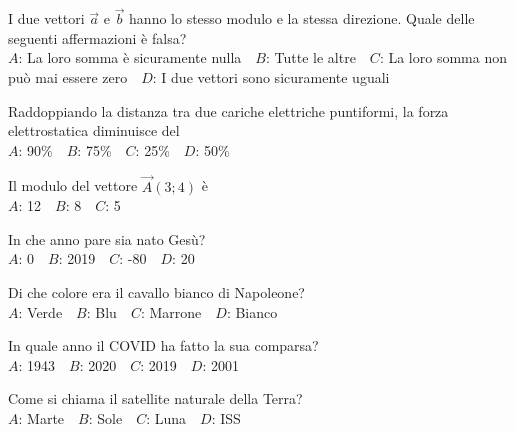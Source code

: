 \mcquestionheader I due vettori $\vec{a}$ e $\vec{b}$ hanno lo stesso modulo e la stessa direzione. Quale delle seguenti affermazioni è falsa?\\
{$A$}: La loro somma è sicuramente nulla\ \ {$B$}: Tutte le altre\ \ {$C$}: La loro somma non può mai essere zero\ \ {$D$}: I due vettori sono sicuramente uguali\ \ 

\mcquestionfooter



\def\mcquestionnumber{5}


\mcquestionheader Raddoppiando la distanza tra due cariche elettriche puntiformi, la forza elettrostatica diminuisce del\\
{$A$}: 90\%\ \ {$B$}: 75\%\ \ {$C$}: 25\%\ \ {$D$}: 50\%\ \ 

\mcquestionfooter



\def\mcquestionnumber{6}


\mcquestionheader Il modulo del vettore $\vec{A}(3;4)$ è\\
{$A$}: 12\ \ {$B$}: 8\ \ {$C$}: 5\ \ 

\mcquestionfooter



\def\mcquestionnumber{7}


\mcquestionheader In che anno pare sia nato Gesù?\\
{$A$}: 0\ \ {$B$}: 2019\ \ {$C$}: -80\ \ {$D$}: 20\ \ 

\mcquestionfooter



\def\mcquestionnumber{8}


\mcquestionheader Di che colore era il cavallo bianco di Napoleone?\\
{$A$}: Verde\ \ {$B$}: Blu\ \ {$C$}: Marrone\ \ {$D$}: Bianco\ \ 

\mcquestionfooter



\def\mcquestionnumber{9}


\mcquestionheader In quale anno il COVID ha fatto la sua comparsa?\\
{$A$}: 1943\ \ {$B$}: 2020\ \ {$C$}: 2019\ \ {$D$}: 2001\ \ 

\mcquestionfooter



\def\mcquestionnumber{10}


\mcquestionheader Come si chiama il satellite naturale della Terra?\\
{$A$}: Marte\ \ {$B$}: Sole\ \ {$C$}: Luna\ \ {$D$}: ISS\ \ 

